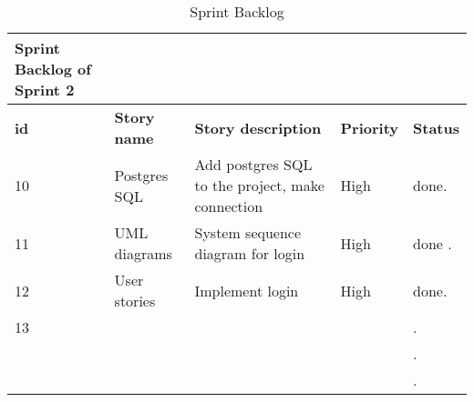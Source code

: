 \documentclass{scrartcl}
\begin{document}
\begin{table}[H]

\begin{center}
\begin{tabular}{| p{2.5cm}| p{4cm} | p{5cm} |p{2.5cm} | p{4cm}|}
   Sprint Backlog of Sprint 2\\ \hline
    

          \textbf{id}  &  \textbf{Story name} &  \textbf{Story description} &  \textbf{Priority}  & \textbf{Status}\\ \hline
               
                
                  10 & Postgres SQL & Add postgres SQL to the project, make connection & High & done. \\ \hline
                    11& UML diagrams & System sequence diagram for login & High & done . \\ \hline
                    12 &  User stories &  Implement login & High & done. \\ \hline
                     13 &  &  &  & . \\ \hline
                       &  &  &  & . \\ \hline
                        &  &  &  & . \\ \hline
         \end{tabular}
    \end{center}
    \caption{Sprint Backlog}
    \label{tab:typo}
\end{table}     
\end{document}

